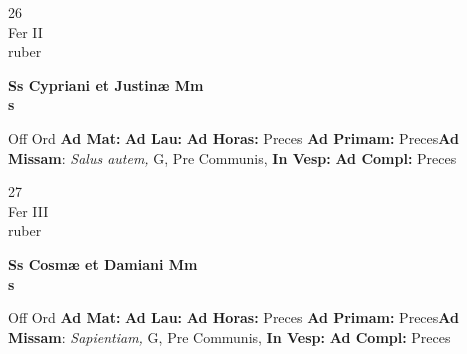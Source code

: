 \documentclass[10pt, openany]{book}
\begin{document}
    \begin{center}
        \begin{minipage}{3.5in}
            \vspace{2em}
            \begin{minipage}{0.5in}
                {\Huge 26} \\
                {\normalsize Fer II} \\
                {\normalsize ruber}
            \end{minipage}
            \begin{minipage}{3.0in}
                \textbf{ \large Ss Cypriani et Justinæ Mm \\
                \textnormal{\normalsize s}} \\ 
            \end{minipage}
            \begin{justify}Off Ord
                \textbf{Ad Mat: }
                \textbf{Ad Lau: }
                \textbf{Ad Horas: }Preces
                \textbf{Ad Primam: }Preces\textbf{Ad Missam}: \textit{Salus autem,} G, Pre Communis,  
                \textbf{In Vesp: }
                \textbf{Ad Compl: }Preces
            \end{justify}
        \end{minipage}
    \end{center}

    \begin{center}
        \begin{minipage}{3.5in}
            \vspace{2em}
            \begin{minipage}{0.5in}
                {\Huge 27} \\
                {\normalsize Fer III} \\
                {\normalsize ruber}
            \end{minipage}
            \begin{minipage}{3.0in}
                \textbf{ \large Ss Cosmæ et Damiani Mm \\
                \textnormal{\normalsize s}} \\ 
            \end{minipage}
            \begin{justify}Off Ord
                \textbf{Ad Mat: }
                \textbf{Ad Lau: }
                \textbf{Ad Horas: }Preces
                \textbf{Ad Primam: }Preces\textbf{Ad Missam}: \textit{Sapientiam,} G, Pre Communis,  
                \textbf{In Vesp: }
                \textbf{Ad Compl: }Preces
            \end{justify}
        \end{minipage}
    \end{center}
\end{document}
